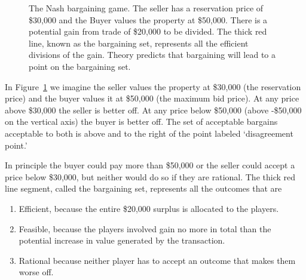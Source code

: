 \begin{figure}
\centering

\caption[The Nash bargaining game]{The Nash bargaining game. The seller has a reservation price of \$30,000 and the Buyer values the property at \$50,000. There is a potential gain from trade of \$20,000 to be divided. The thick red line, known as the bargaining set, represents all the efficient divisions of the gain. Theory predicts that bargaining will lead to a point on the bargaining set.}
\label{fig:Nash-bargaining-game}
\end{figure}


In Figure~\ref{fig:Nash-bargaining-game} we imagine the seller values the property at \$30,000 (the reservation price) and the buyer values it at \$50,000 (the maximum bid price).  At any price above \$30,000 the seller is better off. At any price below \$50,000 (above -\$50,000 on the vertical axis) the buyer is better off. 
The set of acceptable bargains acceptable to both is above and to the right of the point labeled `disagreement point.' 

In principle the buyer could pay more than \$50,000 or the seller could accept a price below \$30,000, but neither would do so if they are rational. 
The thick red line segment, called the bargaining set, represents all the outcomes that are\begin{enumerate}
    \item Efficient, because the entire \$20,000 surplus is allocated to the players. 
    \item Feasible, because the players involved gain no more in total than the potential increase in value generated by the transaction.
    \item Rational because neither player has to accept an outcome that makes them worse off.
\end{enumerate}   

